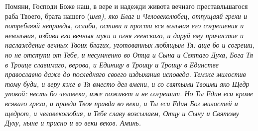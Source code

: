  


Помяни, Господи Боже наш, в вере и надежди живота вечнаго преставльшагося раба Твоего, брата нашего (\itshape имя\normalfont{}), яко Благ и Человеколюбец, отпущаяй грехи и потребляяй неправды, ослаби, остави и прости вся вольная его согрешения и невольная, избави его вечныя муки и огня геенскаго, и даруй ему причастие и наслаждение вечных Твоих благих, уготованных любящым Тя: аще бо и согреши, но не отступи от Тебе, и несумненно во Отца и Сына и Святаго Духа, Бога Тя в Троице славимаго, верова, и Единицу в Троицу и Троицу в Единстве православно даже до последняго своего издыхания исповеда. Темже милостив тому буди, и веру яже в Тя вместо дел вмени, и со святыми Твоими яко Щедр упокой: несть бо человека, иже поживет и не согрешит. Но Ты Един еси кроме всякаго греха, и правда Твоя правда во веки, и Ты еси Един Бог милостей и щедрот, и человеколюбия, и Тебе славу возсылаем, Отцу и Сыну и Святому Духу, ныне и присно и во веки веков. Аминь. 
\mychapterending

 


